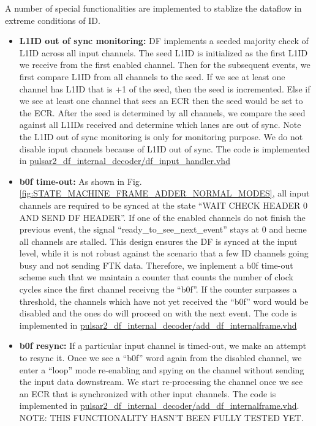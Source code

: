 \documentclass[11pt,letterpaper]{article}
\begin{document}
A number of special functionalities are implemented to stablize the dataflow in extreme conditions of ID. 
\begin{itemize}
\item \textbf{L1ID out of sync monitoring:} DF implements a seeded majority check of L1ID across all input channels. The seed L1ID is initialized as the first L1ID we receive from the first enabled channel. Then for the subsequent events, we first compare L1ID from all channels to the seed. If we see at least one channel has L1ID that is +1 of the seed, then the seed is incremented. Else if we see at least one channel that sees an ECR then the seed would be set to the ECR. After the seed is determined by all channels, we compare the seed against all L1IDs received and determine which lanes are out of sync. Note the L1ID out of sync monitoring is only for monitoring purpose. We do not disable input channels because of L1ID out of sync.  The code is implemented in \url{pulsar2_df_internal_decoder/df_input_handler.vhd}

\item \textbf{b0f time-out:} As shown in Fig. \ref{fig:STATE_MACHINE_FRAME_ADDER_NORMAL_MODES}, all input channels are required to be synced at the state ``WAIT CHECK HEADER 0 AND SEND DF HEADER''. If one of the enabled channels do not finish the previous event, the signal ``ready\_to\_see\_next\_event'' stays at 0 and hecne all channels are stalled. This design ensures the DF is synced at the input level, while it is not robust against the scenario that a few ID channels going busy and not sending FTK data. Therefore, we inplement a b0f time-out scheme such that we maintain a counter that counts the number of clock cycles since the first channel receivng the ``b0f''. If the counter surpasses a threshold, the channels which have not yet received the ``b0f'' word would be disabled and the ones do will proceed on with the next event. The code is implemented in \url{pulsar2_df_internal_decoder/add_df_internalframe.vhd}

\item \textbf{b0f resync:} If a particular input channel is timed-out, we make an attempt to resync it. Once we see a ``b0f'' word again from the disabled channel, we enter a ``loop'' mode re-enabling and spying on the channel without sending the input data downstream. We start re-processing the channel once we see an ECR that is synchronized with other input channels. The code is implemented in \url{pulsar2_df_internal_decoder/add_df_internalframe.vhd}. NOTE: THIS FUNCTIONALITY HASN'T BEEN FULLY TESTED YET.
\end{itemize}
\end{document}
